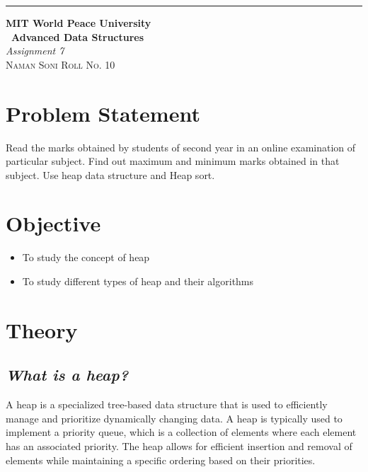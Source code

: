 \documentclass{article}
\begin{document}
\begin{titlepage} %
	
	\raggedleft\rule{1pt}{\textheight} %
	\hspace{0.05\textwidth} %
	\parbox[b]{0.75\textwidth}
	{ %
		
		{\Huge\bfseries MIT World Peace University \\[0.5\baselineskip] \ Advanced Data Structures}\\[2\baselineskip] %
		{\large\textit{Assignment 7}}\\[4\baselineskip] %
		{\Large\textsc{Naman Soni Roll No. 10}} %
		
		\vspace{0.5\textheight} %
	}
	
\end{titlepage}
\tableofcontents
\pagebreak
\section{\textbf{Problem Statement}}
Read the marks obtained by students of second year in an online examination of
particular subject. Find out maximum and minimum marks obtained in that subject. Use
heap data structure and Heap sort.
\section{\textbf{Objective}}
\begin{itemize}
    \item To study the concept of heap
    \item To study different types of heap and their algorithms
\end{itemize}
\section{\textbf{Theory}}
\subsection{\textit{What is a heap?}}
A heap is a specialized tree-based data structure that is used to efficiently manage and prioritize dynamically changing data. A heap is typically used to implement a priority queue, which is a collection of elements where each element has an associated priority. The heap allows for efficient insertion and removal of elements while maintaining a specific ordering based on their priorities.\\
\end{document}
